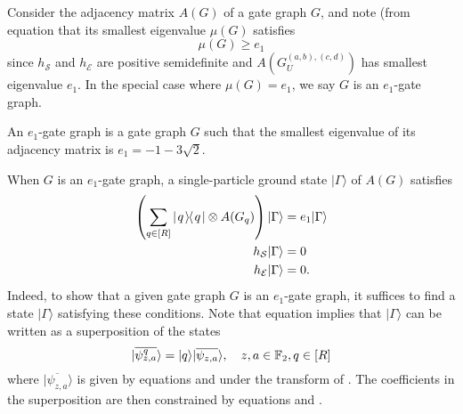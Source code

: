 \documentclass[../thesis-main/thesis-main]{subfiles}
\begin{document}
Consider the adjacency matrix $A(G)$ of a gate graph $G$, and note (from equation  that its smallest eigenvalue $\mu(G)$ satisfies
\begin{equation}
\mu(G)\geq e_{1}
\end{equation}
since $h_{\mathcal{S}}$ and $h_{\mathcal{E}}$ are positive semidefinite and $A(G_{U}^{(a,b),(c,d)})$ has smallest eigenvalue $e_{1}$. In the special case where $\mu(G)=e_{1}$, we say $G$ is an $e_{1}$-gate graph.

\begin{definition}
An $e_{1}$-gate graph is a gate graph $G$ such that the smallest eigenvalue of its adjacency matrix is $e_{1}=-1-3\sqrt{2}$.
\end{definition}

When $G$ is an $e_{1}$-gate graph, a single-particle ground state $|\Gamma\rangle$ of $A(G)$ satisfies 
\begin{align}
\left(\sum_{q\in [R]} |\mspace{2mu} q \mspace{2mu} \rangle\mspace{-2mu}\langle\mspace{2mu} q \mspace{2mu} | \otimes A(G_q)\right)|\Gamma\rangle & =e_{1}|\Gamma\rangle\label{eq:Gamma_disc}\\
h_{\mathcal{S}}|\Gamma\rangle & =0\label{eq:h_s_0}\\
h_{\mathcal{E}}|\Gamma\rangle & =0.\label{eq:h_e_0}
\end{align}
Indeed, to show that a given gate graph $G$ is an $e_{1}$-gate graph, it suffices to find a state $|\Gamma\rangle$ satisfying these conditions. Note that equation  implies that $|\Gamma\rangle$ can be written as a superposition of the states
\begin{equation}
  |\overline{\psi_{z,a}^{q}}\rangle=|q\rangle|\overline{\psi_{z,a}}\rangle,\quad
  z,a\in \mathbb{F}_2, q\in[R]
\end{equation}
where $|\overline{\psi_{z,a}}\rangle$ is given by equations  and  under the transform of . The coefficients in the superposition are then constrained by equations  and .


%
%
\end{document}
